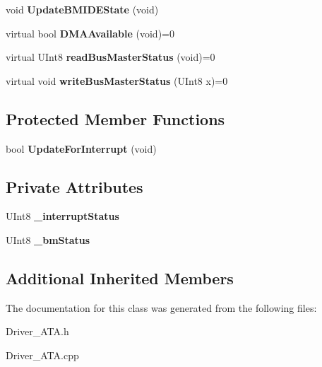 \begin{DoxyCompactItemize}
void {\bfseries Update\+B\+M\+I\+D\+E\+State} (void)
\item 
\mbox{\label{class_a_t_a_driver_node_aa2a9cb6f18a21ffa7ac059b271d1bb9f}} 
virtual bool {\bfseries D\+M\+A\+Available} (void)=0
\item 
\mbox{\label{class_a_t_a_driver_node_a507da936d6bcce3fc41b875699c12015}} 
virtual U\+Int8 {\bfseries read\+Bus\+Master\+Status} (void)=0
\item 
\mbox{\label{class_a_t_a_driver_node_a95d650298bffca359cd9800ba0fb29b9}} 
virtual void {\bfseries write\+Bus\+Master\+Status} (U\+Int8 x)=0
\end{DoxyCompactItemize}
\subsection*{Protected Member Functions}
\begin{DoxyCompactItemize}
\item 
\mbox{\label{class_a_t_a_driver_node_a59256e38b62527a4d3d56347c3048b34}} 
bool {\bfseries Update\+For\+Interrupt} (void)
\end{DoxyCompactItemize}
\subsection*{Private Attributes}
\begin{DoxyCompactItemize}
\item 
\mbox{\label{class_a_t_a_driver_node_ad0aa8b905e16b316ef54d32792479979}} 
U\+Int8 {\bfseries \+\_\+interrupt\+Status}
\item 
\mbox{\label{class_a_t_a_driver_node_a9d4da4f71c18023dba9536ef358ef97a}} 
U\+Int8 {\bfseries \+\_\+bm\+Status}
\end{DoxyCompactItemize}
\subsection*{Additional Inherited Members}


The documentation for this class was generated from the following files\+:\begin{DoxyCompactItemize}
\item 
Driver\+\_\+\+A\+T\+A.\+h\item 
Driver\+\_\+\+A\+T\+A.\+cpp\end{DoxyCompactItemize}

